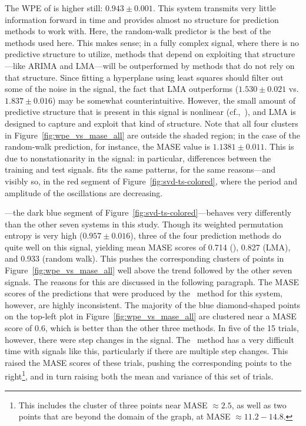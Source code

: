 The WPE of \gcc is higher still: $0.943 \pm 0.001$.  This system
transmits very little information forward in time and provides almost
no structure for prediction methods to work with.  Here, the
random-walk predictor is the best of the methods used here.  This
makes sense; in a fully complex signal, where there is no predictive
structure to utilize, methods that depend on exploiting that
structure---like ARIMA and LMA---will be outperformed by methods that
do not rely on that structure.
% 
%
Since fitting a hyperplane using least squares should filter out some
of the noise in the signal, the fact that LMA outperforms \arima
($1.530 \pm 0.021$ vs. $1.837 \pm 0.016$) may be somewhat
counterintuitive.  However, the small amount of predictive structure
that is present in this signal is nonlinear (cf.,~\cite{mytkowicz09}),
and LMA is designed to capture and exploit that kind of structure.
Note that all four \gcc clusters in Figure~\ref{fig:wpe_vs_mase_all}
are outside the shaded region; in the case of the random-walk
prediction, for instance, the MASE value is $1.1381 \pm 0.011$.  This
is due to nonstationarity in the signal: in particular, differences
between the training and test signals.  \svdtwo fits the same
patterns, for the same reasons---and visibly so, in the red segment of
Figure~\ref{fig:svd-ts-colored}, where the period and amplitude of the
oscillations are decreasing.

\svdone---the dark blue segment of
Figure~\ref{fig:svd-ts-colored}---behaves very differently than the
other seven systems in this study.  Though its weighted permutation
entropy is very high ($0.957 \pm 0.016$), three of the four prediction
methods do quite well on this signal, yielding mean MASE scores of
0.714 (\arima), 0.827 (LMA), and 0.933 (random walk).  This pushes the
corresponding clusters of points in Figure~\ref{fig:wpe_vs_mase_all}
well above the trend followed by the other seven signals.  The reasons
for this are discussed in the following paragraph.  The MASE scores of
the predictions that were produced by the \naive ~method for this
system, however, are highly inconsistent.  The majority of the blue
diamond-shaped points on the top-left plot in
Figure~\ref{fig:wpe_vs_mase_all} are clustered near a MASE score of
0.6, which is better than the other three methods.  In five of the 15
\svdone trials, however, there were step changes in the signal.  The
\naive ~method has a very difficult time with signals like this,
particularly if there are multiple step changes.  This raised the MASE
scores of these trials, pushing the corresponding points to the
right\footnote{This includes the cluster of three points near MASE
  $\approx 2.5$, as well as two points that are beyond the domain of
  the graph, at MASE $\approx 11.2-14.8$.}, and in turn raising both
the mean and variance of this set of trials.

